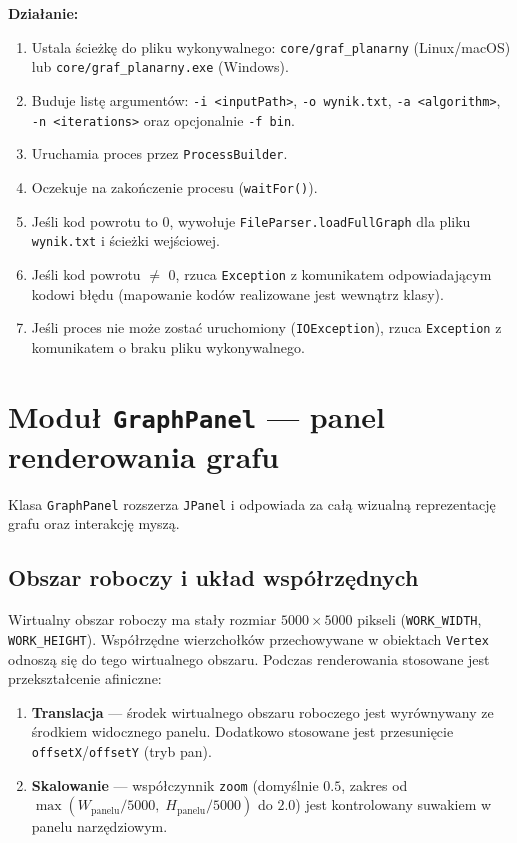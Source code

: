 \documentclass[a4paper, 11pt]{article}
\begin{document}
\textbf{Działanie:}
\begin{enumerate}
  \item Ustala ścieżkę do pliku wykonywalnego: \texttt{core/graf\_planarny}
    (Linux/macOS) lub \texttt{core/graf\_planarny.exe} (Windows).
  \item Buduje listę argumentów: \texttt{-i <inputPath>},
    \texttt{-o wynik.txt}, \texttt{-a <algorithm>},
    \texttt{-n <iterations>} oraz opcjonalnie \texttt{-f bin}.
  \item Uruchamia proces przez \texttt{ProcessBuilder}.
  \item Oczekuje na zakończenie procesu (\texttt{waitFor()}).
  \item Jeśli kod powrotu to 0, wywołuje \texttt{FileParser.loadFullGraph}
    dla pliku \texttt{wynik.txt} i ścieżki wejściowej.
  \item Jeśli kod powrotu $\neq$ 0, rzuca \texttt{Exception}
    z komunikatem odpowiadającym kodowi błędu (mapowanie kodów
    realizowane jest wewnątrz klasy).
  \item Jeśli proces nie może zostać uruchomiony (\texttt{IOException}),
    rzuca \texttt{Exception} z komunikatem o braku pliku wykonywalnego.
\end{enumerate}

\section{Moduł \texttt{GraphPanel} --- panel renderowania grafu}

Klasa \texttt{GraphPanel} rozszerza \texttt{JPanel} i odpowiada za całą
wizualną reprezentację grafu oraz interakcję myszą.

\subsection{Obszar roboczy i układ współrzędnych}

Wirtualny obszar roboczy ma stały rozmiar $5000 \times 5000$ pikseli
(\texttt{WORK\_WIDTH}, \texttt{WORK\_HEIGHT}). Współrzędne wierzchołków
przechowywane w obiektach \texttt{Vertex} odnoszą się do tego wirtualnego
obszaru. Podczas renderowania stosowane jest przekształcenie afiniczne:

\begin{enumerate}
  \item \textbf{Translacja} --- środek wirtualnego obszaru roboczego
    jest wyrównywany ze środkiem widocznego panelu. Dodatkowo stosowane
    jest przesunięcie \texttt{offsetX}/\texttt{offsetY} (tryb pan).
  \item \textbf{Skalowanie} --- współczynnik \texttt{zoom} (domyślnie
    $0.5$, zakres od $\max(W_{\text{panelu}}/5000,\; H_{\text{panelu}}/5000)$
    do $2.0$) jest kontrolowany suwakiem w panelu narzędziowym.
\end{enumerate}
\end{document}
